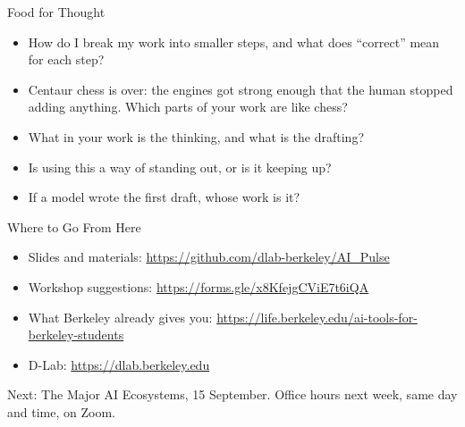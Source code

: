 \documentclass[aspectratio=169]{beamer}
\begin{document}
\begin{frame}{Food for Thought}
    \begin{itemize}\setlength{\itemsep}{9pt}
        \item How do I break my work into smaller steps, and what does ``correct'' mean for
              each step?
        \item Centaur chess is over: the engines got strong enough that the human stopped
              adding anything. Which parts of your work are like chess?
        \item What in your work is the thinking, and what is the drafting?
        \item Is using this a way of standing out, or is it keeping up?
        \item If a model wrote the first draft, whose work is it?
    \end{itemize}
\end{frame}

\begin{frame}{Where to Go From Here}
    \begin{itemize}\setlength{\itemsep}{8pt}
        \item Slides and materials: \url{https://github.com/dlab-berkeley/AI_Pulse}
        \item Workshop suggestions: \url{https://forms.gle/x8KfejgCViE7t6iQA}
        \item What Berkeley already gives you:
              \url{https://life.berkeley.edu/ai-tools-for-berkeley-students}
        \item D-Lab: \url{https://dlab.berkeley.edu}
    \end{itemize}

    \vspace{1em}
    \begin{center}
    Next: The Major AI Ecosystems, 15 September.
    Office hours next week, same day and time, on Zoom.
    \end{center}
\end{frame}
\end{document}
